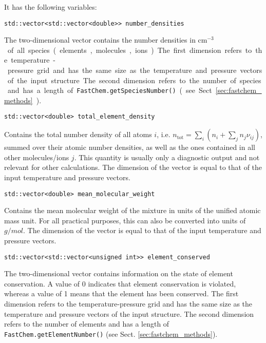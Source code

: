 \documentclass[numbers=noenddot]{fcmanual}
\begin{document}
It has the following variables:

\lstinline!std::vector<std::vector<double>> number_densities!
  \begin{addmargin}[25pt]{0pt}
    The two-dimensional vector contains the number densities in \unit{cm$^{-3}$} of all species (elements, molecules, ions). The first dimension refers to the temperature-pressure grid and has the same size as the temperature and pressure vectors of the input structure. The second dimension refers to the number of species and has a length of \lstinline!FastChem.getSpeciesNumber()! (see Sect. \ref{sec:fastchem_methods}).
  \end{addmargin}
  
\bigbreak

\lstinline!std::vector<double> total_element_density!
\begin{addmargin}[25pt]{0pt}
  Contains the total number density of all atoms $i$, i.e. $n_\mathrm{tot} = \sum_i \left( n_i + \sum_j n_j \nu_{ij} \right)$, summed over their atomic number densities, as well as the ones contained in all other molecules/ions $j$. This quantity is usually only a diagnostic output and not relevant for other calculations. The dimension of the vector is equal to that of the input temperature and pressure vectors.
\end{addmargin}

\bigbreak

\lstinline!std::vector<double> mean_molecular_weight!
\begin{addmargin}[25pt]{0pt}
  Contains the mean molecular weight of the mixture in units of the unified atomic mass unit. For all practical purposes, this can also be converted into units of $\unit{g/mol}$. The dimension of the vector is equal to that of the input temperature and pressure vectors.
\end{addmargin}

\bigbreak

\lstinline!std::vector<std::vector<unsigned int>> element_conserved!
\begin{addmargin}[25pt]{0pt}
  The two-dimensional vector contains information on the state of element conservation. A value of 0 indicates that element conservation is violated, whereas a value of 1 means that the element has been conserved. The first dimension refers to the temperature-pressure grid and has the same size as the temperature and pressure vectors of the input structure. The second dimension refers to the number of elements and has a length of \lstinline!FastChem.getElementNumber()! (see Sect. \ref{sec:fastchem_methods}).
\end{addmargin}
\end{document}
